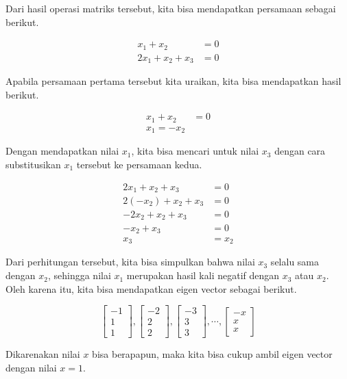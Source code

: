 \documentclass{article}
\begin{document}
Dari hasil operasi matriks tersebut, kita bisa mendapatkan persamaan sebagai berikut.

\begin{align}
    x_1 + x_2 &= 0 \\
    2x_1 + x_2 + x_3 &= 0
\end{align}

Apabila persamaan pertama tersebut kita uraikan, kita bisa mendapatkan hasil berikut.

\begin{align*}
 x_1 + x_2 &= 0 \\
    x_1 = -x_2
\end{align*}

Dengan mendapatkan nilai $x_1$, kita bisa mencari untuk nilai $x_3$ dengan cara substitusikan $x_1$ tersebut ke persamaan kedua.

\begin{align*}
2x_1 + x_2 + x_3 &= 0\\
    2(-x_2)+x_2+x_3 &= 0\\
    -2x_2+x_2+x_3 &= 0\\
    -x_2 + x_3 &= 0\\
    x_3 &= x_2
\end{align*}

Dari perhitungan tersebut, kita bisa simpulkan bahwa nilai $x_3$ selalu sama dengan $x_2$, sehingga nilai $x_1$ merupakan hasil kali negatif dengan $x_3$ atau $x_2$. Oleh karena itu, kita bisa mendapatkan eigen vector sebagai berikut.

$$
\begin{bmatrix}
    -1\\
    1\\
    1
\end{bmatrix}
,
\begin{bmatrix}
    -2\\
    2\\
    2
\end{bmatrix}
,
\begin{bmatrix}
    -3\\
    3\\
    3
\end{bmatrix},
\cdots
,
\begin{bmatrix}
    -x\\
    x\\
    x
\end{bmatrix}
$$

Dikarenakan nilai $x$ bisa berapapun, maka kita bisa cukup ambil eigen vector dengan nilai $x=1$.
\end{document}
